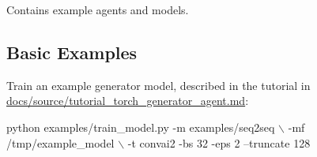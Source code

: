 Contains example agents and models.

\subsection*{Basic Examples}

Train an example generator model, described in the tutorial in {\ttfamily \hyperlink{tutorial__torch__generator__agent_8md}{docs/source/tutorial\+\_\+torch\+\_\+generator\+\_\+agent.\+md}}\+:


\begin{DoxyCode}
python examples/train\_model.py -m examples/seq2seq \(\backslash\)
    -mf /tmp/example\_model \(\backslash\)
    -t convai2 -bs 32 -eps 2 --truncate 128
\end{DoxyCode}
 